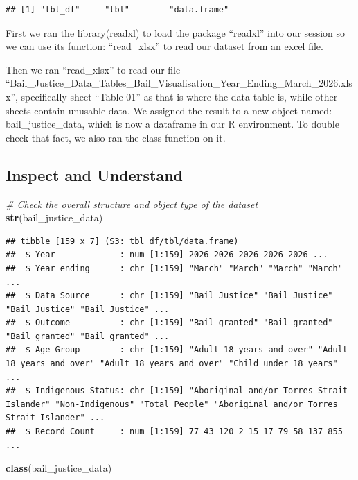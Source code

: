 \documentclass[
]{article}
\newenvironment{Shaded}{\begin{snugshade}}{\end{snugshade}}
\newcommand{\CommentTok}[1]{\textcolor[rgb]{0.56,0.35,0.01}{\textit{#1}}}
\newcommand{\FunctionTok}[1]{\textcolor[rgb]{0.13,0.29,0.53}{\textbf{#1}}}
\newcommand{\NormalTok}[1]{#1}
\begin{document}
\begin{verbatim}
## [1] "tbl_df"     "tbl"        "data.frame"
\end{verbatim}

First we ran the library(readxl) to load the package ``readxl'' into our
session so we can use its function: ``read\_xlsx'' to read our dataset
from an excel file.

Then we ran ``read\_xlsx'' to read our file
``Bail\_Justice\_Data\_Tables\_Bail\_Visualisation\_Year\_Ending\_March\_2026.xlsx'',
specifically sheet ``Table 01'' as that is where the data table is,
while other sheets contain unusable data. We assigned the result to a
new object named: bail\_justice\_data, which is now a dataframe in our R
environment. To double check that fact, we also ran the class function
on it.

\subsection{\texorpdfstring{\textbf{Inspect and
Understand}}{Inspect and Understand}}\label{inspect-and-understand}

\begin{Shaded}
\begin{Highlighting}[]
\CommentTok{\# Check the overall structure and object type of the dataset}
\FunctionTok{str}\NormalTok{(bail\_justice\_data)}
\end{Highlighting}
\end{Shaded}

\begin{verbatim}
## tibble [159 x 7] (S3: tbl_df/tbl/data.frame)
##  $ Year             : num [1:159] 2026 2026 2026 2026 2026 ...
##  $ Year ending      : chr [1:159] "March" "March" "March" "March" ...
##  $ Data Source      : chr [1:159] "Bail Justice" "Bail Justice" "Bail Justice" "Bail Justice" ...
##  $ Outcome          : chr [1:159] "Bail granted" "Bail granted" "Bail granted" "Bail granted" ...
##  $ Age Group        : chr [1:159] "Adult 18 years and over" "Adult 18 years and over" "Adult 18 years and over" "Child under 18 years" ...
##  $ Indigenous Status: chr [1:159] "Aboriginal and/or Torres Strait Islander" "Non-Indigenous" "Total People" "Aboriginal and/or Torres Strait Islander" ...
##  $ Record Count     : num [1:159] 77 43 120 2 15 17 79 58 137 855 ...
\end{verbatim}

\begin{Shaded}
\begin{Highlighting}[]
\FunctionTok{class}\NormalTok{(bail\_justice\_data)}
\end{Highlighting}
\end{Shaded}
\end{document}
